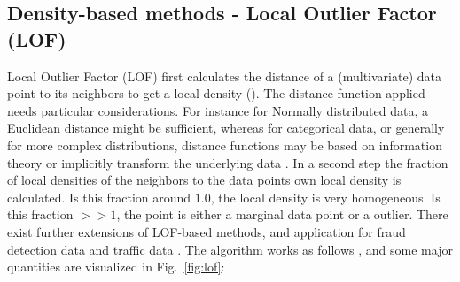 \documentclass[conference]{IEEEtran}
\begin{document}
\subsection{Density-based methods - Local Outlier Factor (LOF)} \label{sec:lof}


Local Outlier Factor (LOF) first calculates the distance of a (multivariate) data point to its neighbors to get a local density (\cite{breunig2000lof}). The distance function applied needs particular considerations. For instance for Normally distributed data, a Euclidean distance might be sufficient, whereas for categorical data, or generally for more complex distributions, distance functions may be based on information theory or implicitly transform the underlying data \cite{cha2007comprehensive}. In a second step the fraction of local densities of the neighbors to the data points own local density is calculated. Is this fraction around $1.0$, the local density is very homogeneous. Is this fraction $>>1$, the point is either a marginal data point or a outlier. There exist further extensions of LOF-based methods, and application for fraud detection data \cite{ma2013fault} and traffic data \cite{ma2016density}. The algorithm works as follows \cite{ma2016density}, and some major quantities are visualized in Fig.~\ref{fig:lof}:
\end{document}
